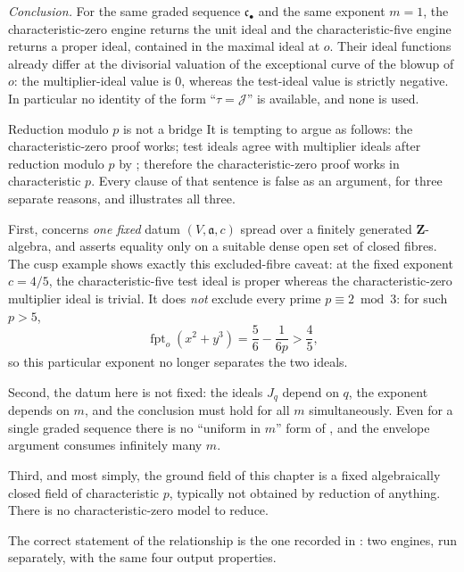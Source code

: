 \begin{example}
\emph{Conclusion.}  For the same graded sequence $\mathfrak c_\bullet$ and
the same exponent $m=1$, the characteristic-zero engine returns the unit
ideal and the characteristic-five engine returns a proper ideal, contained
in the maximal ideal at $o$.  Their ideal functions already differ at the
divisorial valuation of the exceptional curve of the blowup of $o$: the
multiplier-ideal value is $0$, whereas the test-ideal value is strictly
negative.  In particular no identity of the form
``$\tau=\mathcal J$'' is available, and none is used.
\end{example}

\begin{warning}{Reduction modulo \texorpdfstring{$p$}{p} is not a bridge}
\label{warn:ch40-no-reduction}
It is tempting to argue as follows: the characteristic-zero proof works;
test ideals agree with multiplier ideals after reduction modulo $p$ by
; therefore the characteristic-zero proof works
in characteristic $p$.  Every clause of that sentence is false as an
argument, for three separate reasons, and  illustrates
all three.

First,  concerns \emph{one fixed} datum
$(V,\mathfrak a,c)$ spread over a finitely generated
$\mathbf Z$-algebra, and asserts equality only on a suitable dense open
set of closed fibres.  The cusp example shows exactly this excluded-fibre
caveat: at the fixed exponent $c=4/5$, the characteristic-five test ideal
is proper whereas the characteristic-zero multiplier ideal is trivial.  It
does \emph{not} exclude every prime $p\equiv2\bmod3$: for such $p>5$,
\[
 \operatorname{fpt}_o(x^2+y^3)=\frac56-\frac1{6p}>\frac45,
\]
so this particular exponent no longer separates the two ideals.

Second, the datum here is not fixed: the ideals $J_q$ depend on $q$, the
exponent depends on $m$, and the conclusion must hold for all $m$
simultaneously.  Even for a single graded sequence there is no ``uniform in
$m$'' form of , and the envelope argument
consumes infinitely many $m$.

Third, and most simply, the ground field of this chapter is a fixed
algebraically closed field of characteristic $p$, typically not obtained by
reduction of anything.  There is no characteristic-zero model to reduce.

The correct statement of the relationship is the one recorded in
: two engines, run separately, with
the same four output properties.
\end{warning}

